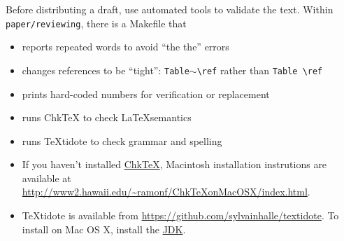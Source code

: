 Before distributing a draft, use automated tools to validate the text.
Within \texttt{paper/reviewing}, there is a Makefile that
\begin{itemize}
	\item reports repeated words to avoid ``the the'' errors
	\item changes references to be ``tight'': \texttt{Table$\scriptstyle\sim$\textbackslash{}ref} rather than \texttt{Table \textbackslash{}ref}
	\item prints hard-coded numbers for verification or replacement
	\item runs ChkTeX to check \LaTeX semantics
	\item runs TeXtidote to check grammar and spelling
\end{itemize}

\begin{itemize}
\item 
If you haven't installed \href{https://ctan.org/pkg/chktex?lang=en}{ChkTeX}, Macintosh installation instrutions are available at \url{http://www2.hawaii.edu/~ramonf/ChkTeXonMacOSX/index.html}.
\item
TeXtidote is available from \url{https://github.com/sylvainhalle/textidote}.
To install on Mac OS X, install the \href{https://www.oracle.com/technetwork/java/javase/downloads/jdk8-downloads-2133151.html}{JDK}.
\end{itemize}
